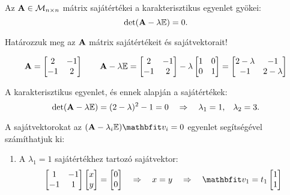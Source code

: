 \documentclass{szb-practice}
\begin{document}
\begin{theorem}
  Az $\mathbf{A} \in \mathcal M_{n \times n}$ mátrix sajátértékei a
  karakterisztikus egyenlet gyökei:
  $$
    \det(\mathbf{A} - \lambda \mathbb{E}) = 0
    \text.
  $$
\end{theorem}

\begin{example}[][nobreak]
  Határozzuk meg az $\mathbf{A}$ mátrix sajátértékeit és sajátvektorait!

  $$
    \mathbf{A} = \begin{bmatrix}
      2  & -1 \\
      -1 & 2
    \end{bmatrix}
    \qquad
    \mathbf{A} - \lambda \mathbb{E} = \begin{bmatrix}
      2  & -1 \\
      -1 & 2
    \end{bmatrix} - \lambda \begin{bmatrix}
      1 & 0 \\
      0 & 1
    \end{bmatrix} = \begin{bmatrix}
      2 - \lambda & -1          \\
      -1          & 2 - \lambda
    \end{bmatrix}
  $$

  A karakterisztikus egyenlet, és ennek alapján a sajátértékek:
  $$
    \det(\mathbf{A} - \lambda \mathbb{E}) = (2 - \lambda)^2 - 1 = 0
    \quad \Rightarrow \quad
    \lambda_1 = 1 \text, \quad \lambda_2 = 3 \text.
  $$

  A sajátvektorokat az $(\rmat A - \lambda_i \imat) \rvec v_i = 0$
  egyenlet segítségével számíthatjuk ki:

  \begin{enumerate}
    \item A $\lambda_1 = 1$ sajátértékhez tartozó sajátvektor:
          $$
            \begin{bmatrix}
              1  & -1 \\
              -1 & 1
            \end{bmatrix} \begin{bmatrix}
              x \\
              y
            \end{bmatrix} = \begin{bmatrix}
              0 \\
              0
            \end{bmatrix}
            \quad \Rightarrow \quad
            x = y
            \quad \Rightarrow \quad
            \rvec v_1 = t_1 \begin{bmatrix}
              1 \\
              1
            \end{bmatrix}
          $$


\end{enumerate}
\end{example}
\end{document}
